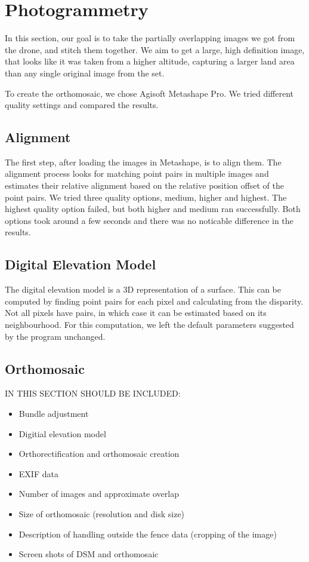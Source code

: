 \documentclass[../Head/Main.tex]{subfiles}
\begin{document}
\section{Photogrammetry}
In this section, our goal is to take the partially overlapping images we got from the drone, and stitch them together.
We aim to get a large, high definition image, that looks like it was taken from a higher altitude, 
capturing a larger land area than any single original image from the set.

To create the orthomosaic, we chose Agisoft Metashape Pro. 
We tried different quality settings and compared the results.

\subsection{Alignment}

The first step, after loading the images in Metashape, is to align them.
The alignment process looks for matching point pairs in multiple images and estimates their relative alignment based on the relative position offset of the point pairs.
We tried three quality options, medium, higher and highest.
The highest quality option failed, but both higher and medium ran successfully.
Both options took around a few seconds and there was no noticable difference in the results.

\subsection{Digital Elevation Model}
The digital elevation model is a 3D representation of a surface.
This can be computed by finding point pairs for each pixel and calculating from the disparity.
Not all pixels have pairs, in which case it can be estimated based on its neighbourhood.
For this computation, we left the default parameters suggested by the program unchanged.

\subsection{Orthomosaic}


IN THIS SECTION SHOULD BE INCLUDED:
\begin{itemize}
\item Bundle adjustment
\item Digitial elevation model
\item Orthorectification and orthomosaic creation
\item EXIF data
\item Number of images and approximate overlap
\item Size of orthomosaic (resolution and disk size)
\item Description of handling outside the fence data (cropping of the image)
\item Screen shots of DSM and orthomosaic
\end{itemize}
\end{document}
